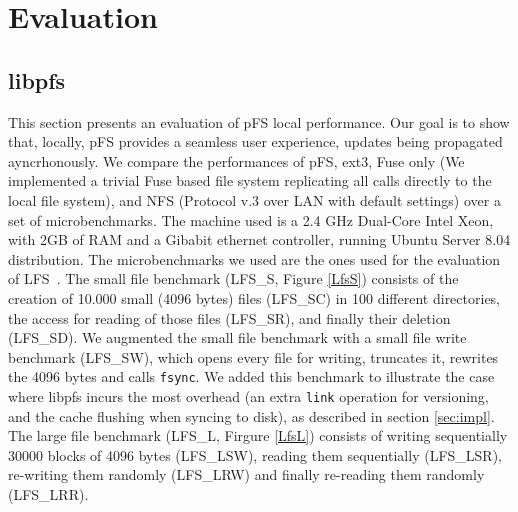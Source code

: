 
\section{Evaluation}
\label{sec:eval}


\subsection{libpfs}

This section presents an evaluation of pFS local performance. Our goal
is to show that, locally, pFS provides a seamless user experience,
updates being propagated ayncrhonously. We compare the performances of
pFS, ext3, Fuse only (We implemented a trivial Fuse based file system
replicating all calls directly to the local file system), and NFS
(Protocol v.3 over LAN with default settings) over a set of
microbenchmarks. The machine used is a 2.4 GHz Dual-Core Intel Xeon,
with 2GB of RAM and a Gibabit ethernet controller, running Ubuntu
Server 8.04 distribution. The microbenchmarks we used are the ones
used for the evaluation of LFS~\cite{rosenblum:lfs}. The small file
benchmark (LFS\_S, Figure \ref{LfsS}) consists of the creation of
10.000 small (4096 bytes) files (LFS\_SC) in 100 different
directories, the access for reading of those files (LFS\_SR), and
finally their deletion (LFS\_SD). We augmented the small file
benchmark with a small file write benchmark (LFS\_SW), which opens
every file for writing, truncates it, rewrites the 4096 bytes and
calls {\tt fsync}.  We added this benchmark to illustrate the case
where libpfs incurs the most overhead (an extra {\tt link} operation
for versioning, and the cache flushing when syncing to disk), as
described in section \ref{sec:impl}. The large file benchmark (LFS\_L,
Firgure \ref{LfsL}) consists of writing sequentially 30000 blocks of
4096 bytes (LFS\_LSW), reading them sequentially (LFS\_LSR),
re-writing them randomly (LFS\_LRW) and finally re-reading them
randomly (LFS\_LRR).

